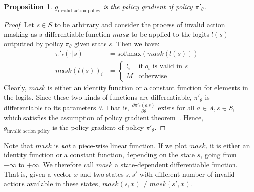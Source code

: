 \documentclass[letterpaper]{article}
\newtheorem{prop}{Proposition}
\begin{document}

\begin{prop}
\label{prop:policy_gradient}
$g_{\text{invalid action policy}}$ is the policy gradient of policy $\pi'_{\theta}$.
\end{prop}
\begin{proof} Let $s\in S$ to be arbitrary and consider the process of invalid action masking as a differentiable function $mask$ to be applied to the logits $l(s)$ outputted by policy $\pi_\theta$ given state $s$. Then we have:
\begin{align*}
    \pi'_{\theta}(\cdot \vert s) &= \text{softmax}(mask(l(s))) \\
    mask(l(s))_i &= \begin{cases}
     l_i &\text{if $a_i$ is valid in $s$}\\
     M &\text{otherwise}
    \end{cases}
\end{align*}
Clearly, $mask$ is either an identity function or a constant function for elements in the logits. Since these two kinds of functions are differentiable, $\pi'_{\theta}$ is differentiable to its parameters $\theta$. That is, $\frac{\partial \pi'_{\theta}(a\vert s)}{\partial \theta}$ exists for all $a\in A, s\in S$, which satisfies the assumption of  policy gradient theorem~\cite{sutton2000policy}. Hence, $g_{\text{invalid action policy}}$ is the policy gradient of policy $\pi'_{\theta}$.
\end{proof}
Note that $mask$ is \emph{not} a piece-wise linear function. If we plot $mask$, it is either an identity function or a constant function, depending on the state $s$, going from $-\infty$ to $+\infty$. We therefore call $mask$ a state-dependent differentiable function. That is, given a vector $x$  and two states $s, s'$ with different number of invalid actions available in these states, $mask(s,x) \neq mask(s', x)$.
\end{document}
